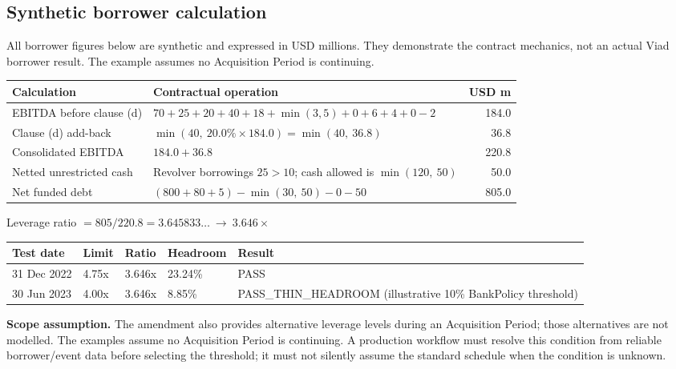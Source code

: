 \documentclass[10pt,letterpaper]{article}
\newcommand{\tabsize}{\footnotesize}
\begin{document}
\subsection{Synthetic borrower calculation}
All borrower figures below are synthetic and expressed in USD millions. They demonstrate the contract mechanics, not an actual Viad borrower result. The example assumes no Acquisition Period is continuing.

\smallskip
\begin{tabularx}{\linewidth}{@{}l Y r@{}}
\toprule
\tabsize\textbf{Calculation} & \tabsize\textbf{Contractual operation} & \tabsize\textbf{USD m} \\
\midrule
\tabsize EBITDA before clause (d) & \tabsize $70+25+20+40+18+\min(3,5)+0+6+4+0-2$ & \tabsize 184.0 \\
\tabsize Clause (d) add-back & \tabsize $\min(40,\ 20.0\%\times184.0)=\min(40,\ 36.8)$ & \tabsize 36.8 \\
\tabsize Consolidated EBITDA & \tabsize $184.0+36.8$ & \tabsize 220.8 \\
\tabsize Netted unrestricted cash & \tabsize Revolver borrowings $25>10$; cash allowed is $\min(120,\ 50)$ & \tabsize 50.0 \\
\tabsize Net funded debt & \tabsize $(800+80+5)-\min(30,\ 50)-0-50$ & \tabsize 805.0 \\
\bottomrule
\end{tabularx}

\smallskip
\centerline{\small Leverage ratio $=805/220.8=3.645833\ldots\ \longrightarrow\ 3.646\times$}
\smallskip

\begin{tabularx}{\linewidth}{@{}l l l l Y@{}}
\toprule
\tabsize\textbf{Test date} & \tabsize\textbf{Limit} & \tabsize\textbf{Ratio} & \tabsize\textbf{Headroom} & \tabsize\textbf{Result} \\
\midrule
\tabsize 31 Dec 2022 & \tabsize 4.75x & \tabsize 3.646x & \tabsize 23.24\% & \tabsize PASS \\
\tabsize 30 Jun 2023 & \tabsize 4.00x & \tabsize 3.646x & \tabsize 8.85\% & \tabsize PASS\_THIN\_HEADROOM (illustrative 10\% BankPolicy threshold) \\
\bottomrule
\end{tabularx}

\textbf{Scope assumption.} The amendment also provides alternative leverage levels during an Acquisition Period; those alternatives are not modelled. The examples assume no Acquisition Period is continuing. A production workflow must resolve this condition from reliable borrower/event data before selecting the threshold; it must not silently assume the standard schedule when the condition is unknown.
\end{document}
